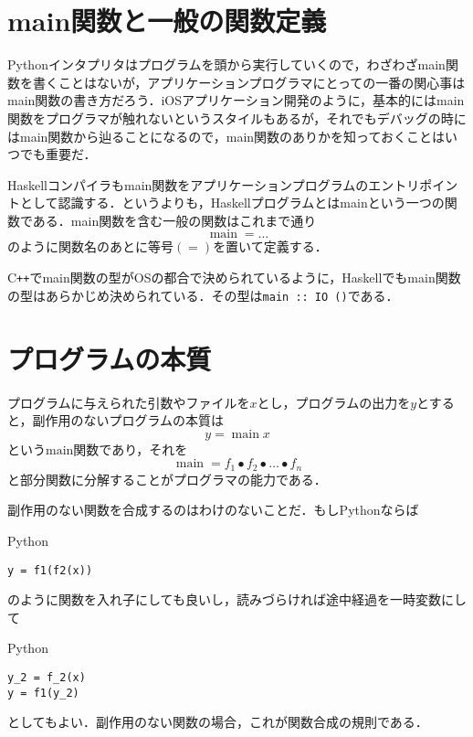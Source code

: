 \documentclass[a4paper,draft]{jsbook}
\newcommand{\programminglanguage}[1]{\textsf{#1}}
\newcommand{\cxx}{\programminglanguage{C}\texttt{++}}
\newcommand{\haskell}{\programminglanguage{Haskell}}
\newcommand{\python}{\programminglanguage{Python}}
\newcommand{\code}[1]{\texttt{#1}}
\newenvironment{pythoncode}{\begin{itembox}[r]{\python}}{\end{itembox}}
\DeclareMathOperator{\mathMain}{main}
\newcommand{\mathCompose}{\mathbin{\bullet}}
\begin{document}
\section{main関数と一般の関数定義}

\python インタプリタはプログラムを頭から実行していくので，わざわざmain関数を書くことはないが，アプリケーションプログラマにとっての一番の関心事はmain関数の書き方だろう．iOSアプリケーション開発のように，基本的にはmain関数をプログラマが触れないというスタイルもあるが，それでもデバッグの時にはmain関数から辿ることになるので，main関数のありかを知っておくことはいつでも重要だ．

\haskell コンパイラもmain関数をアプリケーションプログラムのエントリポイントとして認識する．というよりも，\haskell プログラムとはmainという一つの関数である．main関数を含む一般の関数はこれまで通り
\begin{equation}
\mathMain=\dots
\end{equation}
のように関数名のあとに等号$(=)$を置いて定義する．

\cxx でmain関数の型がOSの都合で決められているように，\haskell でもmain関数の型はあらかじめ決められている．その型は\code{main :: IO ()}である．


\section{プログラムの本質}

プログラムに与えられた引数やファイルを$x$とし，プログラムの出力を$y$とすると，副作用のないプログラムの本質は
\begin{equation}
y=\mathMain x
\end{equation}
という$\text{main}$関数であり，それを
\begin{equation}
\mathMain=f_1\mathCompose f_2\mathCompose\dots\mathCompose f_n
\end{equation}
と部分関数に分解することがプログラマの能力である．

副作用のない関数を合成するのはわけのないことだ．もし\python ならば
\begin{pythoncode}
\begin{verbatim}
y = f1(f2(x))
\end{verbatim}
\end{pythoncode}
のように関数を入れ子にしても良いし，読みづらければ途中経過を一時変数にして
\begin{pythoncode}
\begin{verbatim}
y_2 = f_2(x)
y = f1(y_2)
\end{verbatim}
\end{pythoncode}
としてもよい．副作用のない関数の場合，これが関数合成の規則である．
\end{document}
